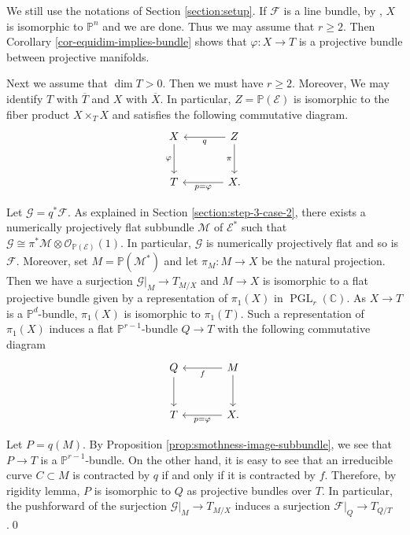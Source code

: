 \documentclass[english,reqno]{amsart}
\newcommand\bbC{{\mathbb C}}
\newcommand\bbP{{\mathbb P}}
\newcommand\sE{{\mathscr E}}
\newcommand\sF{{\mathscr F}}
\newcommand\sG{{\mathscr G}}
\newcommand\sM{{\mathscr M}}
\newcommand\sO{{\mathscr O}}
\DeclareMathOperator*{\PGL}{PGL}
\theoremstyle{plain}
\theoremstyle{definition}
\numberwithin{equation}{section} %
\begin{document}
\label{section:step-4-case-2}
We still use the notations of Section \ref{section:setup}. If $\sF$ is a line bundle, by \cite[Corollaire]{Druel2004}, $X$ is isomorphic to $\bbP^n$ and we are done. Thus we may assume that $r\geq 2$. Then Corollary \ref{cor-equidim-implies-bundle} shows that $\varphi\colon X\rightarrow T$ is a projective bundle between projective manifolds.

Next we assume that $\dim T>0$. Then we must have $r\geq 2$. Moreover, We may identify $T$ with $\overline{T}$ and $X$ with $\overline{X}$. In particular, $Z=\bbP(\sE)$ is isomorphic to the fiber product $X\times_T X$ and satisfies the following commutative diagram.
\[
\begin{tikzcd}[column sep=large, row sep=large]
X\dar[swap]{\varphi} & Z \lar{q}\dar[swap]{\pi} \\
T &
X\lar{p=\varphi}.
\end{tikzcd}
\]

Let $\sG  =  q^*\sF$. As explained in Section \ref{section:step-3-case-2}, there exists a numerically projectively flat subbundle $\sM$ of $\sE^*$ such that $\sG\cong \pi^*\sM\otimes \sO_{\bbP(\sE)}(1)$. In particular, $\sG$ is numerically projectively flat and so is $\sF$. Moreover, set $M=\bbP(\sM^*)$ and let $\pi_M\colon M\rightarrow X$ be the natural projection.  Then we have a surjection $\sG\vert_M\rightarrow T_{M/X}$ and $M\rightarrow X$ is isomorphic to a flat projective bundle given by a representation of $\pi_1(X)$ in $\PGL_{r}(\bbC)$. As $X\rightarrow T$ is a $\bbP^d$-bundle, $\pi_1(X)$ is isomorphic to $\pi_1(T)$.
Such a representation of $\pi_1(X)$ induces a flat $\bbP^{r-1}$-bundle  $Q\rightarrow T$ with the following commutative diagram
\[
\begin{tikzcd}[column sep=large, row sep=large]
Q\dar[swap]{} & M \lar{f}\dar[swap]{}    \\
T &
X\lar{p=\varphi}.
\end{tikzcd}
\] 

Let $P=q(M)$. By Proposition \ref{prop:smothness-image-subbundle}, we see that $P\rightarrow T$ is a $\bbP^{r-1}$-bundle. On the other hand, it is easy to see that an irreducible curve $C\subset M$ is contracted by $q$ if and only if it is contracted by $f$. Therefore, by rigidity lemma, $P$ is isomorphic to $Q$ as projective bundles over $T$. In particular, the pushforward of the surjection $\sG\vert_{M}\rightarrow T_{M/X}$ induces a surjection $\sF\vert_Q\rightarrow T_{Q/T}$.\hfill \qed
\end{document}
